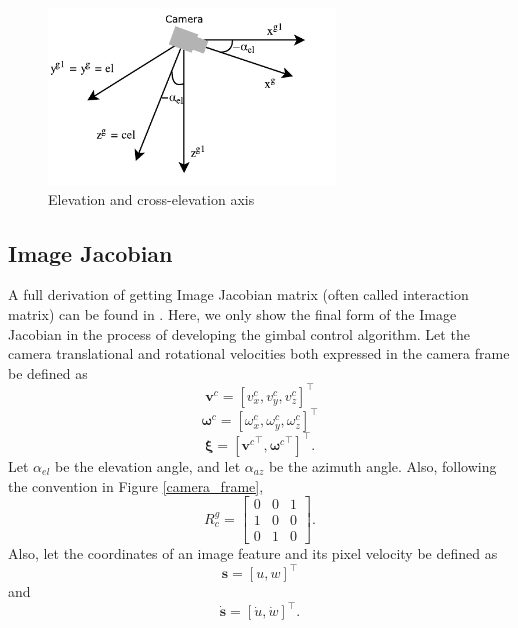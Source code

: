 \begin{figure}[htbp]
	\centering
	\includegraphics[width = 3in]{images/chapter2/cross_elevation.pdf}
	\caption{Elevation and cross-elevation axis}
	\label{cross_elevation}
\end{figure}
\subsection{Image Jacobian}
A full derivation of getting Image Jacobian matrix (often called interaction matrix) can be found in \cite{spong2006robot}. Here, we only show the final form of the Image Jacobian in the process of developing the gimbal control algorithm. Let the camera translational and rotational velocities both expressed in the camera frame be defined as
\begin{equation}
\mathbf{v}^c=[v_x^c, v_y^c, v_z^c]^\top
\end{equation}
\begin{equation}
\mathbf{\omega}^c=[\omega_x^c, \omega_y^c, \omega_z^c]^\top
\end{equation}
\begin{equation}
\mathbf{\xi}=[{\mathbf{v}^c}^\top, {\mathbf{\omega}^c}^\top]^\top.
\label{camera_velocity}
\end{equation}
Let $\alpha_{el}$ be the elevation angle, and let $\alpha_{az}$ be the azimuth angle. Also, following the convention in Figure \ref{camera_frame}, 
\begin{equation}
R^{g}_c =
\begin{bmatrix}
0 & 0 & 1 \\
1 & 0 & 0 \\
0 & 1 & 0
\end{bmatrix}.
\end{equation}
Also, let the coordinates of an image feature and its pixel velocity be defined as 
\begin{equation}
\mathbf{s}=[u, w]^\top
\end{equation}
and 
\begin{equation}
\mathbf{\dot{s}}=[\dot{u}, \dot{w}]^\top.
\label{image_feature_velocity}
\end{equation}
